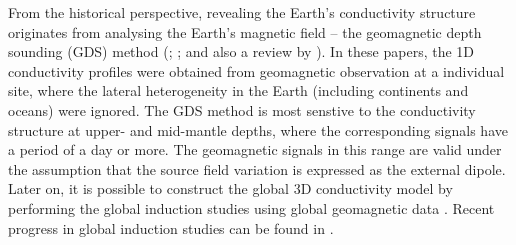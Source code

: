 
	From the historical perspective, revealing the Earth's conductivity structure originates from analysing the Earth's magnetic field --  the geomagnetic depth sounding (GDS) method (\citealp{chapman1930a}; \citealp{banks1969a}; and also a review by \citealp{tarits1994a}). 
	In these papers, the 1D conductivity profiles were obtained from geomagnetic observation at a individual site, where the lateral heterogeneity in the Earth (including continents and oceans) were ignored.
	The GDS method is most senstive to the conductivity structure at upper- and mid-mantle depths, where the corresponding signals have a period of a day or more.
	The geomagnetic signals in this range are valid under the assumption that the source field variation is expressed as the external dipole.
	Later on, it is possible to construct the global 3D conductivity model by performing the global induction studies using global geomagnetic data \citep[e.g.,][]{fukao2004a, koyama2006a, kelbert2008a, kuvshinov2008a, utada2009a}. Recent progress in global induction studies can be found in \citet{kuvshinov2011a}.

